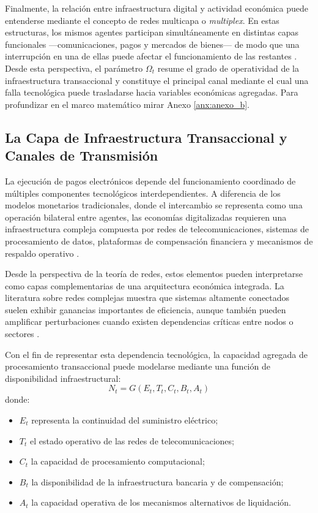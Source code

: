 Finalmente, la relaci\'on entre infraestructura digital y actividad econ\'omica 
puede entenderse mediante el concepto de redes multicapa o \textit{multiplex}. 
En estas estructuras, los mismos agentes participan simult\'aneamente en distintas 
capas funcionales ---comunicaciones, pagos y mercados de bienes--- de modo que una 
interrupci\'on en una de ellas puede afectar el funcionamiento de las restantes 
\citep{dedomenico2013mathematical, kivela2014multilayer}. Desde esta perspectiva, el par\'ametro $\Omega_t$ resume el grado de operatividad de la infraestructura transaccional y constituye el principal canal mediante el cual una falla tecnol\'ogica puede trasladarse hacia variables econ\'omicas agregadas. Para profundizar en el marco matemático mirar Anexo \ref{anx:anexo_b}.

\subsection{La Capa de Infraestructura Transaccional y Canales de Transmisi\'on}
\label{sec:2_3}

La ejecuci\'on de pagos electr\'onicos depende del funcionamiento coordinado de 
m\'ultiples componentes tecnol\'ogicos interdependientes. A diferencia de los 
modelos monetarios tradicionales, donde el intercambio se representa como una 
operaci\'on bilateral entre agentes, las econom\'ias digitalizadas requieren una 
infraestructura compleja compuesta por redes de telecomunicaciones, sistemas de 
procesamiento de datos, plataformas de compensaci\'on financiera y mecanismos de 
respaldo operativo \citep{kahn2009pay, auer2020technology}.

Desde la perspectiva de la teor\'ia de redes, estos elementos pueden interpretarse 
como capas complementarias de una arquitectura econ\'omica integrada. La literatura 
sobre redes complejas muestra que sistemas altamente conectados suelen exhibir 
ganancias importantes de eficiencia, aunque tambi\'en pueden amplificar 
perturbaciones cuando existen dependencias cr\'iticas entre nodos o sectores 
\citep{acemoglu2012network, battiston2012liaisons, elliott2014financial, golub20222fragilitysurvey}.

Con el fin de representar esta dependencia tecnol\'ogica, la capacidad agregada 
de procesamiento transaccional puede modelarse mediante una funci\'on de 
disponibilidad infraestructural:
\begin{equation}
N_t = G(E_t, T_t, C_t, B_t, A_t)
\end{equation}
donde:
\begin{itemize}
    \item $E_t$ representa la continuidad del suministro el\'ectrico;
    \item $T_t$ el estado operativo de las redes de telecomunicaciones;
    \item $C_t$ la capacidad de procesamiento computacional;
    \item $B_t$ la disponibilidad de la infraestructura bancaria y de compensaci\'on;
    \item $A_t$ la capacidad operativa de los mecanismos alternativos de liquidaci\'on.
\end{itemize}

